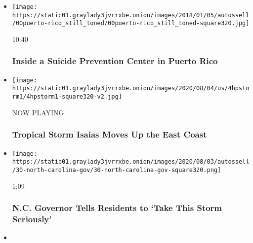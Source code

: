 \begin{itemize}
\item
  \href{https://www.nytimes3xbfgragh.onion/video/us/100000005620786/hurricane-maria-puerto-rico-mental-health.html?action=click\&module=video-series-bar\&region=header\&pgtype=Article\&playlistId=video/extreme-weather}{}

  \texttt{[image: https://static01.graylady3jvrrxbe.onion/images/2018/01/05/autossell/00puerto-rico\_still\_toned/00puerto-rico\_still\_toned-square320.jpg]}

  10:40

  \hypertarget{inside-a-suicide-prevention-center-in-puerto-rico}{%
  \subsubsection{Inside a Suicide Prevention Center in Puerto
  Rico}\label{inside-a-suicide-prevention-center-in-puerto-rico}}
\item
  \texttt{[image: https://static01.graylady3jvrrxbe.onion/images/2020/08/04/us/4hpstorm1/4hpstorm1-square320-v2.jpg]}

  NOW PLAYING

  \hypertarget{tropical-storm-isaias-moves-up-the-east-coast-1}{%
  \subsubsection{Tropical Storm Isaias Moves Up the East
  Coast}\label{tropical-storm-isaias-moves-up-the-east-coast-1}}
\item
  \href{https://www.nytimes3xbfgragh.onion/video/us/100000007271090/north-carolina-isaias-coronavirus.html?action=click\&module=video-series-bar\&region=header\&pgtype=Article\&playlistId=video/extreme-weather}{}

  \texttt{[image: https://static01.graylady3jvrrxbe.onion/images/2020/08/03/autossell/30-north-carolina-gov/30-north-carolina-gov-square320.png]}

  1:09

  \hypertarget{nc-governor-tells-residents-to-take-this-storm-seriously}{%
  \subsubsection{N.C. Governor Tells Residents to `Take This Storm
  Seriously'}\label{nc-governor-tells-residents-to-take-this-storm-seriously}}
\item
  \href{https://www.nytimes3xbfgragh.onion/video/us/100000007258245/hurricane-douglas-hawaii.html?action=click\&module=video-series-bar\&region=header\&pgtype=Article\&playlistId=video/extreme-weather}{}


\end{itemize}

